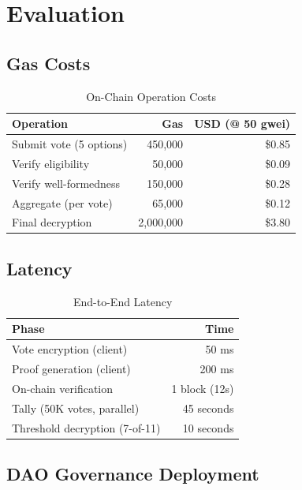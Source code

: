 \documentclass{../shared/luxfhe}
\begin{document}
\section{Evaluation}

\subsection{Gas Costs}

\begin{table}[h]
\centering
\caption{On-Chain Operation Costs}
\begin{tabular}{lrr}
\toprule
Operation & Gas & USD (@ 50 gwei) \\
\midrule
Submit vote (5 options) & 450,000 & \$0.85 \\
Verify eligibility & 50,000 & \$0.09 \\
Verify well-formedness & 150,000 & \$0.28 \\
Aggregate (per vote) & 65,000 & \$0.12 \\
Final decryption & 2,000,000 & \$3.80 \\
\bottomrule
\end{tabular}
\end{table}

\subsection{Latency}

\begin{table}[h]
\centering
\caption{End-to-End Latency}
\begin{tabular}{lr}
\toprule
Phase & Time \\
\midrule
Vote encryption (client) & 50 ms \\
Proof generation (client) & 200 ms \\
On-chain verification & 1 block (12s) \\
Tally (50K votes, parallel) & 45 seconds \\
Threshold decryption (7-of-11) & 10 seconds \\
\bottomrule
\end{tabular}
\end{table}

\subsection{DAO Governance Deployment}
\end{document}
